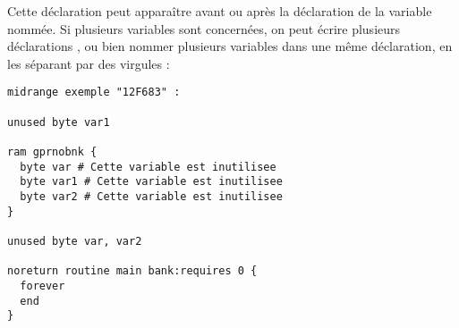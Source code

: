 Cette déclaration peut apparaître avant ou après la déclaration de la variable nommée. Si plusieurs variables sont concernées, on peut écrire plusieurs déclarations , ou bien nommer plusieurs variables dans une même déclaration, en les séparant par des virgules :

\begin{lstlisting}[language=piccolo]
midrange exemple "12F683" :

unused byte var1

ram gprnobnk {
  byte var # Cette variable est inutilisee
  byte var1 # Cette variable est inutilisee
  byte var2 # Cette variable est inutilisee
}

unused byte var, var2

noreturn routine main bank:requires 0 {
  forever
  end
}
\end{lstlisting}


